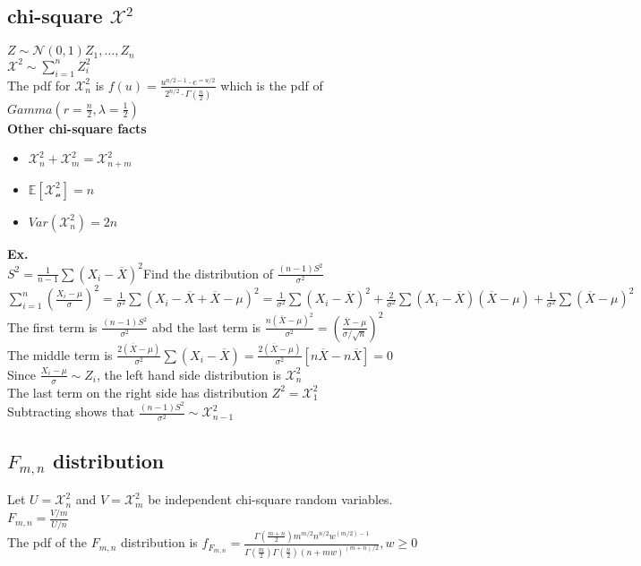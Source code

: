 \documentclass{article}
\begin{document}
\subsection{chi-square $\mathcal{X}^2$}
$Z\sim\mathcal{N}(0,1)$\hspace*{0.5in}$Z_1,\dots,Z_n$\\
$\mathcal{X}^2\sim\sum_{i=1}^nZ_i^2$\\
The pdf for $\mathcal{X}^2_n$ is $f(u)=\frac{u^{n/2-1}\cdot e^{=u/2}}{2^{n/2}\cdot\Gamma(\frac{n}{2})}$ which is the pdf of $Gamma(r=\frac{n}{2},\lambda=\frac{1}{2})$\\
\textbf{Other chi-square facts}
\begin{itemize}
    \item $\mathcal{X}^2_n+\mathcal{X}^2_m=\mathcal{X}^2_{n+m}$
    \item $\mathbb{E}[\mathcal{X^2_n}]=n$
    \item $Var(\mathcal{X}^2_n)=2n$
\end{itemize}
\textbf{Ex.}\\
$S^2=\frac{1}{n-1}\sum(X_i-\overline{X})^2$\hspace*{0.5in}Find the distribution of $\frac{(n-1)S^2}{\sigma^2}$\\
$\sum_{i=1}^n(\frac{X_i-\mu}{\sigma})^2=\frac{1}{\sigma^2}\sum(X_i-\overline{X}+\overline{X}-\mu)^2=\frac{1}{\sigma^2}\sum(X_i-\overline{X})^2+\frac{2}{\sigma^2}\sum(X_i-\overline{X})(\overline{X}-\mu)+\frac{1}{\sigma^2}\sum(\overline{X}-\mu)^2$\\
The first term is $\frac{(n-1)S^2}{\sigma^2}$ abd the last term is $\frac{n(\overline{X}-\mu)^2}{\sigma^2}=(\frac{\overline{X}-\mu}{\sigma/\sqrt{n}})^2$\\
The middle term is $\frac{2(\overline{X}-\mu)}{\sigma^2}\sum(X_i-\overline{X})=\frac{2(\overline{X}-\mu)}{\sigma^2}[n\overline{X}-n\overline{X}]=0$\\
Since $\frac{X_i-\mu}{\sigma}\sim Z_i$, the left hand side distribution is $\mathcal{X}^2_n$\\
The last term on the right side has distribution $Z^2=\mathcal{X}^2_1$\\
Subtracting shows that $\frac{(n-1)S^2}{\sigma^2}\sim\mathcal{X}^2_{n-1}$
\newpage
\subsection{$F_{m,n}$ distribution}
Let $U=\mathcal{X}^2_n$ and $V=\mathcal{X}^2_m$ be independent chi-square random variables.\\
$F_{m,n}=\frac{V/m}{U/n}$\\
The pdf of the $F_{m,n}$ distribution is $f_{F_{m,n}}=\frac{\Gamma(\frac{m+n}{2})m^{m/2}n^{n/2}w^{(m/2)-1}}{\Gamma(\frac{m}{2})\Gamma(\frac{n}{2})(n+mw)^{(m+n)/2}},w\geq0$
\end{document}
